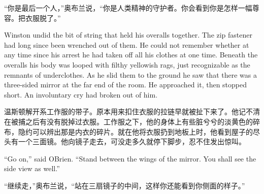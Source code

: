 \begin{paracol}{2}
\switchcolumn

``你是最后一个人，''奥布兰说，``你是人类精神的守护者。你会看到你是怎样一幅尊容。把衣服脱了。''

\switchcolumn*

Winston undid the bit of string that held his overalls together. The zip
fastener had long since been wrenched out of them. He could not remember
whether at any time since his arrest he had taken off all his clothes at
one time. Beneath the overalls his body was looped with filthy yellowish
rags, just recognizable as the remnants of underclothes. As he slid them
to the ground he saw that there was a three-sided mirror at the far end
of the room. He approached it, then stopped short. An involuntary cry
had broken out of him.

\switchcolumn

温斯顿解开系工作服的带子。原本用来扣住衣服的拉链早就被扯下来了。他记不清在被捕之后有没有脱掉过衣服。工作服之下，他的身体上有些脏兮兮的淡黄色的碎布，隐约可以辨出那是内衣的碎片。就在他将衣服扔到地板上时，他看到屋子的尽头有一个三面镜。他向镜子走去，可没走多久就停下脚步，忍不住发出惊叫。

\switchcolumn*

``Go on,'' said O\textquotesingle Brien. ``Stand between the wings of the
mirror. You shall see the side view as well.''

\switchcolumn

``继续走，''奥布兰说，``站在三扇镜子的中间，这样你还能看到你侧面的样子。''

\switchcolumn*


\end{paracol}
